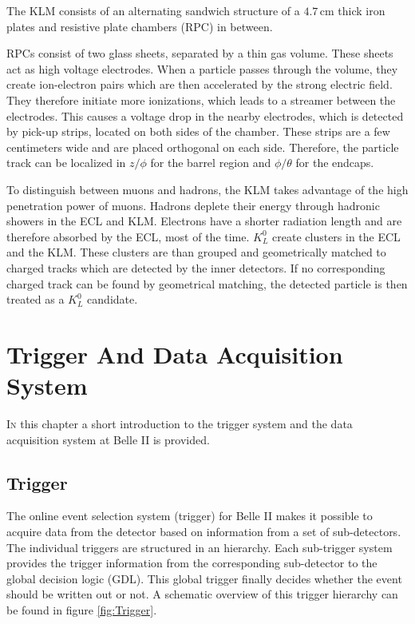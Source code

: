 \documentclass[a4paper,11pt,twosided,final,german,openbib,pdftex,listof=totoc,bibliography=totoc]{scrbook}
\begin{document}
The KLM consists of an alternating sandwich structure of a $4.7\,\textrm{cm}$ thick iron plates and resistive plate chambers (RPC) in between.

RPCs consist of two glass sheets, separated by a thin gas volume. These sheets act as high voltage electrodes. When a particle passes through the volume, they create ion-electron pairs which are then accelerated by the strong electric field. They therefore initiate more ionizations, which leads to a streamer between the electrodes. This causes a voltage drop in the nearby electrodes, which is detected by pick-up strips, located on both sides of the chamber. These strips are a few centimeters wide and are placed orthogonal on each side. Therefore, the particle track can be localized in $z/\phi$ for the barrel region and $\phi/\theta$ for the endcaps.

To distinguish between muons and hadrons, the KLM takes advantage of the high penetration power of muons. Hadrons deplete their energy through hadronic showers in the ECL and KLM. Electrons have a shorter radiation length and are therefore absorbed by the ECL, most of the time. $K_L^0$ create clusters in the ECL and the KLM. These clusters are than grouped and geometrically matched to charged tracks which are detected by the inner detectors. If no corresponding charged track can be found by geometrical matching, the detected particle is then treated as a $K_L^0$ candidate.\cite{B2TR}\cite{KLMS}

\chapter{Trigger And Data Acquisition System}
\label{sec:TDAS}


\lettrine{I}{n} this chapter a short introduction to the trigger system and the data acquisition system at Belle II is provided.


\section{Trigger}

The online event selection system (trigger) for Belle II makes it possible to acquire data from the detector based on information from a set of sub-detectors. The individual triggers are structured in an hierarchy. Each sub-trigger system provides the trigger information from the corresponding sub-detector to the global decision logic (GDL). This global trigger finally decides whether the event should be written out or not. \cite{B2TR} A schematic overview of this trigger hierarchy can be found in figure \ref{fig:Trigger}.
\end{document}
